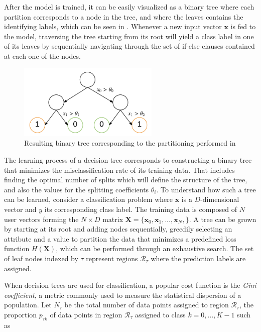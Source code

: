 \documentclass{kththesis}
\begin{document}
After the model is trained, it can be easily visualized as a binary tree where each partition corresponds to a node in the tree, and where the leaves contains the identifying labels, which can be seen in . Whenever a new input vector $\mathbf{x}$ is fed to the model, traversing the tree starting from its root will yield a class label in one of its leaves by sequentially navigating through the set of if-else clauses contained at each one of the nodes.  
 
\begin{figure}[h]
    \centering
    \includegraphics[width=0.6\textwidth,keepaspectratio]{figures/dectree_bin.pdf}
    \caption{Resulting binary tree corresponding to the partitioning performed in }
    \label{fig:dectree_bin}
\end{figure}
 
The learning process of a decision tree corresponds to constructing a binary tree that minimizes the misclassification rate of its training data. That includes finding the optimal number of splits which will define the structure of the tree, and also the values for the splitting coefficients $\theta_i$. To understand how such a tree can be learned, consider a classification problem where $\mathbf{x}$ is a $D$-dimensional vector and $y$ its corresponding class label. The training data is composed of $N$ user vectors forming the $N \times D$ matrix $\mathbf{X} = \{\mathbf{x}_0, \mathbf{x}_1, ..., \mathbf{x}_N,\}$. A tree can be grown by starting at its root and adding nodes sequentially, greedily selecting an attribute and a value to partition the data that minimizes a predefined loss function $H(\mathbf{X})$, which can be performed through an exhaustive search. The set of leaf nodes indexed by $\tau$ represent regions $\mathcal{R}_\tau$ where the prediction labels are assigned.

When decision trees are used for classification, a popular cost function is the \emph{Gini coefficient}, a metric commonly used to measure the statistical dispersion of a population. Let $N_\tau$ be the total number of data points assigned to region $\mathcal{R}_\tau$,  the proportion $p_{\tau k}$ of data points in region $\mathcal{R}_\tau$ assigned to class $k = 0,...,K-1$ such as 
\end{document}
